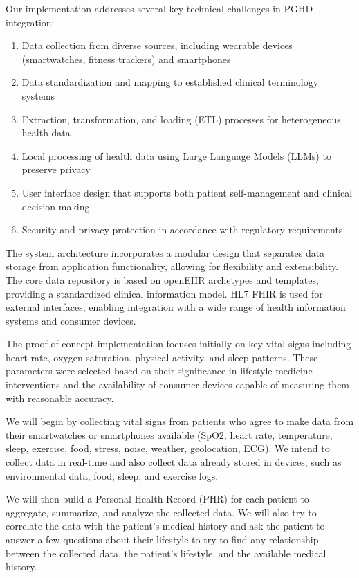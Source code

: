Our implementation addresses several key technical challenges in PGHD integration:

\begin{enumerate}
    \item Data collection from diverse sources, including wearable devices (smartwatches, fitness trackers) and smartphones
    \item Data standardization and mapping to established clinical terminology systems
    \item Extraction, transformation, and loading (ETL) processes for heterogeneous health data
    \item Local processing of health data using Large Language Models (LLMs) to preserve privacy
    \item User interface design that supports both patient self-management and clinical decision-making
    \item Security and privacy protection in accordance with regulatory requirements
\end{enumerate}

The system architecture incorporates a modular design that separates data storage from application functionality, allowing for flexibility and extensibility. The core data repository is based on openEHR archetypes and templates, providing a standardized clinical information model. HL7 FHIR is used for external interfaces, enabling integration with a wide range of health information systems and consumer devices.

The proof of concept implementation focuses initially on key vital signs including heart rate, oxygen saturation, physical activity, and sleep patterns. These parameters were selected based on their significance in lifestyle medicine interventions and the availability of consumer devices capable of measuring them with reasonable accuracy.

We will begin by collecting vital signs from patients who agree to make data from their smartwatches or smartphones available (SpO2, heart rate, temperature, sleep, exercise, food, stress, noise, weather, geolocation, ECG). We intend to collect data in real-time and also collect data already stored in devices, such as environmental data, food, sleep, and exercise logs.

We will then build a Personal Health Record (PHR) for each patient to aggregate, summarize, and analyze the collected data. We will also try to correlate the data with the patient's medical history and ask the patient to answer a few questions about their lifestyle to try to find any relationship between the collected data, the patient's lifestyle, and the available medical history.

